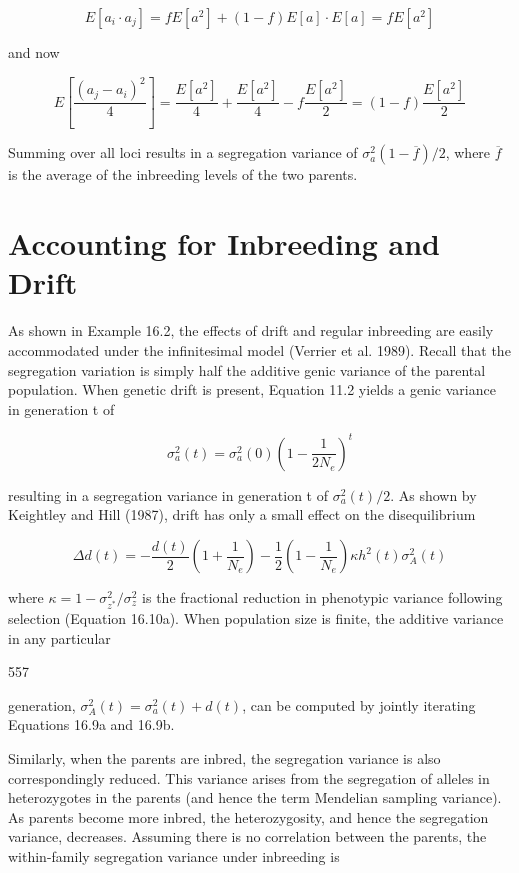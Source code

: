 \documentclass{article}
\begin{document}
\begin{equation}
E[a_{i}\cdot a_{j}]=fE[a^{2}]+(1-f)E[a]\cdot E[a]=fE[a^{2}]
\end{equation}

and now

\begin{equation}
E\left[\frac{(a_{j}-a_{i})^{2}}{4}\right]=\frac{E[a^{2}]}{4}+\frac{E[a^{2}]}{4}-f\frac{E[a^{2}]}{2}=(1-f)\frac{E[a^{2}]}{2}
\end{equation}

Summing over all loci results in a segregation variance of  $ \sigma_a^2(1 - \overline{f})/2 $, where  $ \overline{f} $ is the average of the inbreeding levels of the two parents.

\section{Accounting for Inbreeding and Drift}
As shown in Example 16.2, the effects of drift and regular inbreeding are easily accommodated under the infinitesimal model (Verrier et al. 1989). Recall that the segregation variation is simply half the additive genic variance of the parental population. When genetic drift is present, Equation 11.2 yields a genic variance in generation t of

\begin{equation}
\sigma_{a}^{2}(t)=\sigma_{a}^{2}(0)\left(1-\frac{1}{2N_{e}}\right)^{t}
\tag{16.9a}
\label{eq:16_9a}
\end{equation}

resulting in a segregation variance in generation t of  $ \sigma_{a}^{2}(t)/2 $. As shown by Keightley and Hill (1987), drift has only a small effect on the disequilibrium

\begin{equation}
\Delta d(t)=-\frac{d(t)}{2}\left(1+\frac{1}{N_{e}}\right)-\frac{1}{2}\left(1-\frac{1}{N_{e}}\right)\kappa h^{2}(t)\sigma_{A}^{2}(t)
\tag{16.9b}
\label{eq:16_9b}
\end{equation}

where  $ \kappa = 1 - \sigma_{z^*}^2 / \sigma_z^2 $ is the fractional reduction in phenotypic variance following selection (Equation 16.10a). When population size is finite, the additive variance in any particular

557

generation,  $ \sigma_{A}^{2}(t) = \sigma_{a}^{2}(t) + d(t) $, can be computed by jointly iterating Equations 16.9a and 16.9b.

Similarly, when the parents are inbred, the segregation variance is also correspondingly reduced. This variance arises from the segregation of alleles in heterozygotes in the parents (and hence the term Mendelian sampling variance). As parents become more inbred, the heterozygosity, and hence the segregation variance, decreases. Assuming there is no correlation between the parents, the within-family segregation variance under inbreeding is
\end{document}
